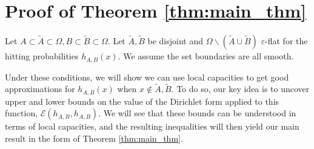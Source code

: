 \documentclass[english, aip, jcp, priprint, graphicx,floatfix]{revtex4-1}
\theoremstyle{plain}
\theoremstyle{definition}
\theoremstyle{plain}
\begin{document}
\section{Proof of Theorem \ref{thm:main_thm}}\label{sec:proof_thm}

Let $A\subset\tilde A\subset\Omega,B\subset\tilde B\subset\Omega$.  Let $\tilde A,\tilde B$ be disjoint and $\Omega \backslash (\tilde A \cup \tilde B)$ $\varepsilon$-flat for the hitting probabilities $h_{A,B}(x)$.  We assume the set boundaries are all smooth.  

Under these conditions, we will show we can use local capacities to get good approximations for $h_{A,B}(x)$ when $x\notin \tilde A,\tilde B$.  To do so, our key idea is to uncover upper and lower bounds on the value of the Dirichlet form applied to this function, $\mathscr{E}(h_{A,B},h_{A,B})$.  We will see that these bounds can be understood in terms of local capacities, and the resulting inequalities will then yield our main result in the form of Theorem \ref{thm:main_thm}.
\end{document}
